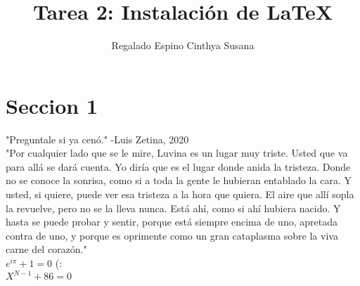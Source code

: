 \documentclass[a4paper,10pt]{article}
\title{Tarea 2: Instalación de LaTeX } %
\author{Regalado Espino Cinthya Susana} %
\begin{document}
\maketitle

% 

\section{Seccion 1}

"Preguntale si ya cenó." -Luis Zetina, 2020 \\ %

"Por cualquier lado que se le mire, Luvina es un lugar muy triste. Usted que va para allá se dará cuenta. Yo diría que es el lugar donde anida la tristeza. Donde no se conoce la sonrisa, como si a toda la gente le hubieran entablado la cara. Y usted, si quiere, puede ver esa tristeza a la hora que quiera. El aire que allí sopla la revuelve, pero no se la lleva nunca. Está ahí, como si ahí hubiera nacido. Y hasta se puede probar y sentir, porque está siempre encima de uno, apretada contra de uno, y porque es oprimente como un gran cataplasma sobre la viva carne del corazón." \\ %

$ e^{i \pi} + 1 = 0 $  %
(: \\
$ X^{N-1} + 86 = 0 $
\end{document}
